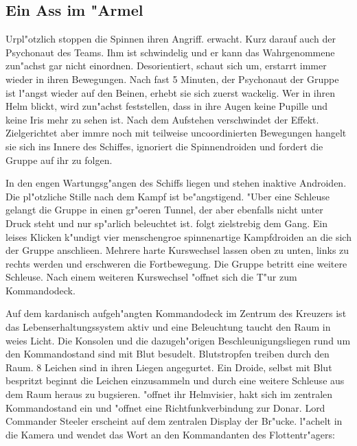 \subsection{Ein Ass im "Armel}
Urpl"otzlich stoppen die Spinnen ihren Angriff. \xl{} erwacht. Kurz darauf auch der Psychonaut des Teams. Ihm ist schwindelig und er kann das Wahrgenommene zun"achst gar nicht einordnen. Desorientiert, schaut \xl{} sich um, erstarrt immer wieder in ihren Bewegungen. Nach fast 5 Minuten, der Psychonaut der Gruppe ist l"angst wieder auf den Beinen, erhebt sie sich zuerst wackelig. Wer in ihren Helm blickt, wird zun"achst feststellen, dass in ihre Augen keine Pupille und keine Iris mehr zu sehen ist. Nach dem Aufstehen verschwindet der Effekt. Zielgerichtet aber immre noch mit teilweise uncoordinierten Bewegungen hangelt sie sich ins Innere des Schiffes, ignoriert die Spinnendroiden und fordert die Gruppe auf ihr zu folgen.


In den engen Wartungsg"angen des Schiffs liegen und stehen inaktive Androiden. Die pl"otzliche Stille nach dem Kampf ist be"angstigend. "Uber eine Schleuse gelangt die Gruppe in einen gr"o\3eren Tunnel, der aber ebenfalls nicht unter Druck steht und nur sp"arlich beleuchtet ist. \xl{} folgt zielstrebig dem Gang. Ein leises Klicken k"undigt vier menschengro\3e spinnenartige Kampfdroiden an die sich der Gruppe anschlie\3en. Mehrere harte Kurswechsel lassen oben zu unten, links zu rechts werden und erschweren die Fortbewegung. 
Die Gruppe betritt eine weitere Schleuse. Nach einem weiteren Kurswechsel "offnet sich die T"ur zum Kommandodeck.

Auf dem kardanisch aufgeh"angten Kommandodeck im Zentrum des Kreuzers ist das Lebenserhaltungssystem aktiv und eine Beleuchtung taucht den Raum in wei\3es Licht. Die Konsolen und die dazugeh"origen Beschleunigungsliegen rund um den Kommandostand sind mit Blut besudelt. Blutstropfen treiben durch den Raum. 8 Leichen sind in ihren Liegen angegurtet. Ein Droide, selbst mit Blut bespritzt beginnt die Leichen einzusammeln und durch eine weitere Schleuse aus dem Raum heraus zu bugsieren. \xl{} "offnet ihr Helmvisier, hakt sich im zentralen Kommandostand ein und "offnet eine Richtfunkverbindung zur Donar. Lord Commander Steeler erscheint auf dem zentralen Display der Br"ucke. \xl{} l"achelt in die Kamera und wendet das Wort an den Kommandanten des Flottentr"agers:

